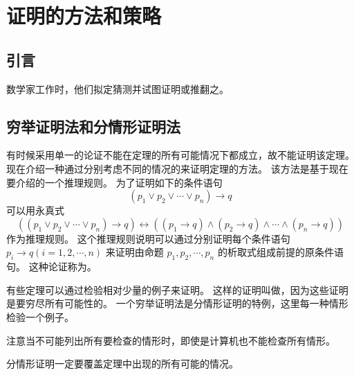 
\section{证明的方法和策略}
{
    \subsection{引言}
    {
        数学家工作时，他们拟定猜测并试图证明或推翻之。
    }

    \subsection{穷举证明法和分情形证明法}
    {
        有时候采用单一的论证不能在定理的所有可能情况下都成立，故不能证明该定理。
        现在介绍一种通过分别考虑不同的情况的来证明定理的方法。
        该方法是基于现在要介绍的一个推理规则。
        为了证明如下的条件语句
        $$(p_1 \vee p_2 \vee \cdots \vee p_n) \rightarrow q$$
        可以用永真式
        $$((p_1 \vee p_2 \vee \cdots \vee p_n) \rightarrow q) \leftrightarrow ((p_1 \rightarrow q) \wedge (p_2 \rightarrow q) \wedge \cdots \wedge (p_n \rightarrow q))$$
        作为推理规则。
        这个推理规则说明可以通过分别证明每个条件语句 $p_i \rightarrow q(i = 1, 2, \cdots , n)$ 来证明由命题 $p_1, p_2, \cdots , p_n$ 的析取式组成前提的原条件语句。
        这种论证称为。

        {
            有些定理可以通过检验相对少量的例子来证明。
            这样的证明叫做，因为这些证明是要穷尽所有可能性的。
            一个穷举证明法是分情形证明的特例，这里每一种情形检验一个例子。

            注意当不可能列出所有要检查的情形时，即使是计算机也不能检查所有情形。
        }

        {
            分情形证明一定要覆盖定理中出现的所有可能的情况。
        }
    }
}